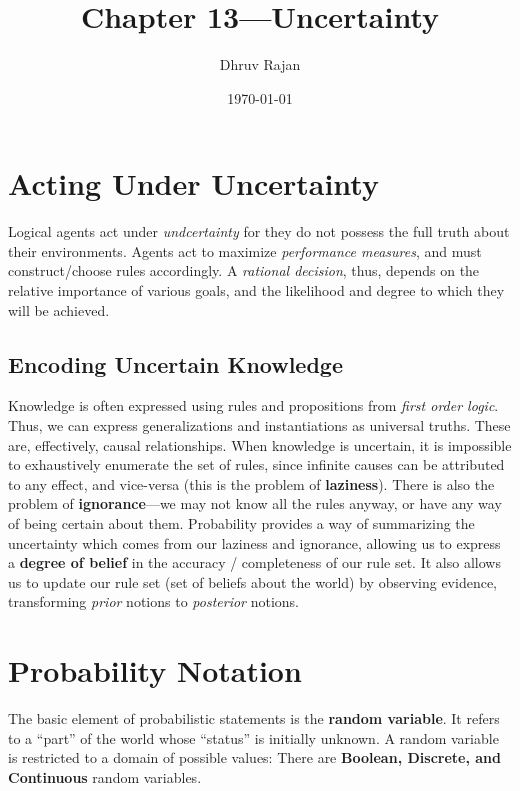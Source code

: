 \documentclass[12pt]{article}
\begin{document}
\title{Chapter 13---Uncertainty}
\author{Dhruv Rajan}
\date{\today}
\maketitle

\section{Acting Under Uncertainty}

Logical agents act under \textit{undcertainty} for they do not possess
the full truth about their environments. Agents act to maximize
\textit{performance measures}, and must construct/choose rules
accordingly. A \textit{rational decision}, thus, depends on the
relative importance of various goals, and the likelihood and degree to
which they will be achieved.

\subsection{Encoding Uncertain Knowledge}

Knowledge is often expressed using rules and propositions from
\textit{first order logic}. Thus, we can express generalizations and
instantiations as universal truths. These are, effectively, causal
relationships. When knowledge is uncertain, it is impossible to
exhaustively enumerate the set of rules, since infinite causes can be
attributed to any effect, and vice-versa (this is the problem of
\textbf{laziness}). There is also the problem of
\textbf{ignorance}---we may not know all the rules anyway, or have any
way of being certain about them. Probability provides a way of
summarizing the uncertainty which comes from our laziness and
ignorance, allowing us to express a \textbf{degree of belief} in the
accuracy / completeness of our rule set. It also allows us to update
our rule set (set of beliefs about the world) by observing evidence, transforming \textit{prior} notions to \textit{posterior} notions.

\section{Probability Notation}

The basic element of probabilistic statements is the \textbf{random
  variable}. It refers to a ``part'' of the world whose ``status'' is
initially unknown. A random variable is restricted to a domain of
possible values: There are \textbf{Boolean, Discrete, and Continuous}
random variables.
\end{document}
